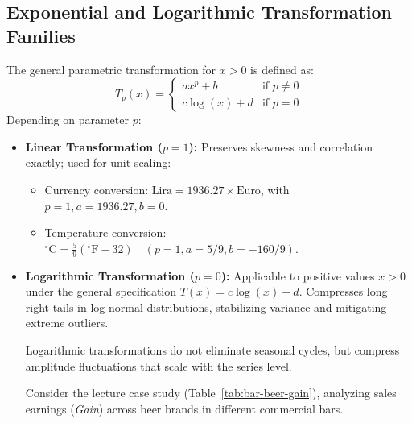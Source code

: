 \subsection{Exponential and Logarithmic Transformation Families}
The general parametric transformation for $x > 0$ is defined as:
\begin{equation}
T_p(x) = \begin{cases}
a x^p + b & \text{if } p \ne 0 \\
c \log(x) + d & \text{if } p = 0
\end{cases}
\end{equation}
Depending on parameter $p$:
\begin{itemize}
    \item \textbf{Linear Transformation ($p=1$):} Preserves skewness and correlation exactly; used for unit scaling:
    \begin{itemize}
        \item Currency conversion: $\text{Lira} = 1936.27 \times \text{Euro}$, with $p=1, a=1936.27, b=0$.
        \item Temperature conversion: $^\circ\text{C} = \frac{5}{9}(^\circ\text{F} - 32) \quad (p=1, a=5/9, b=-160/9)$.
    \end{itemize}
    \item \textbf{Logarithmic Transformation ($p=0$):} Applicable to positive values $x > 0$ under the general specification $T(x) = c \log(x) + d$. Compresses long right tails in log-normal distributions, stabilizing variance and mitigating extreme outliers.
    \begin{remark}
    Logarithmic transformations do not eliminate seasonal cycles, but compress amplitude fluctuations that scale with the series level.
    \end{remark}

    \begin{example}
    Consider the lecture case study (Table~\ref{tab:bar-beer-gain}), analyzing sales earnings (\textit{Gain}) across beer brands in different commercial bars.


\end{example}
\end{itemize}
